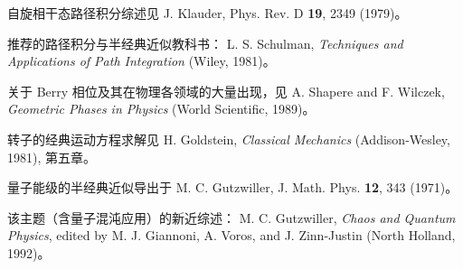 \begin{chapbib}
\item 自旋相干态路径积分综述见
  J. Klauder, Phys. Rev. D \textbf{19}, 2349 (1979)。
\item 推荐的路径积分与半经典近似教科书：
  L. S. Schulman, \textit{Techniques and Applications of Path Integration} (Wiley, 1981)。
\item 关于 Berry 相位及其在物理各领域的大量出现，见
  A. Shapere and F. Wilczek, \textit{Geometric Phases in Physics} (World Scientific, 1989)。
\item 转子的经典运动方程求解见
  H. Goldstein, \textit{Classical Mechanics} (Addison-Wesley, 1981), 第五章。
\item 量子能级的半经典近似导出于
  M. C. Gutzwiller, J. Math. Phys. \textbf{12}, 343 (1971)。
\item 该主题（含量子混沌应用）的新近综述：
  M. C. Gutzwiller, \textit{Chaos and Quantum Physics}, edited by M. J. Giannoni, A. Voros, and J. Zinn-Justin (North Holland, 1992)。
\end{chapbib}
